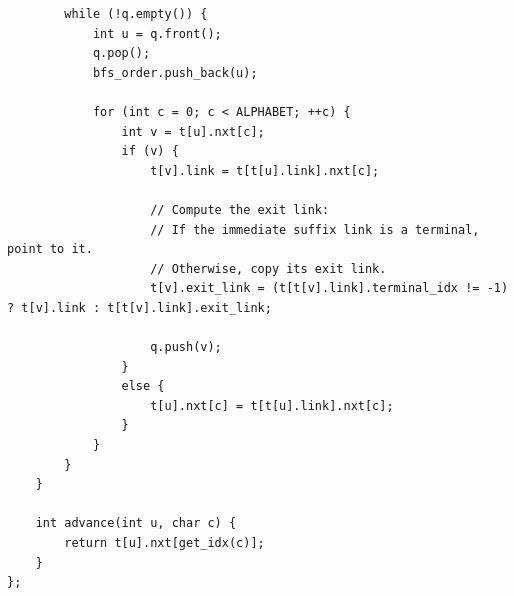 \documentclass[9pt,a4paper,twocolumn]{extarticle}
\begin{document}
\begin{lstlisting}
        while (!q.empty()) {
            int u = q.front();
            q.pop();
            bfs_order.push_back(u);

            for (int c = 0; c < ALPHABET; ++c) {
                int v = t[u].nxt[c];
                if (v) {
                    t[v].link = t[t[u].link].nxt[c];

                    // Compute the exit link:
                    // If the immediate suffix link is a terminal, point to it.
                    // Otherwise, copy its exit link.
                    t[v].exit_link = (t[t[v].link].terminal_idx != -1) ? t[v].link : t[t[v].link].exit_link;

                    q.push(v);
                }
                else {
                    t[u].nxt[c] = t[t[u].link].nxt[c];
                }
            }
        }
    }

    int advance(int u, char c) {
        return t[u].nxt[get_idx(c)];
    }
};
\end{lstlisting}

\filbreak
\end{document}
